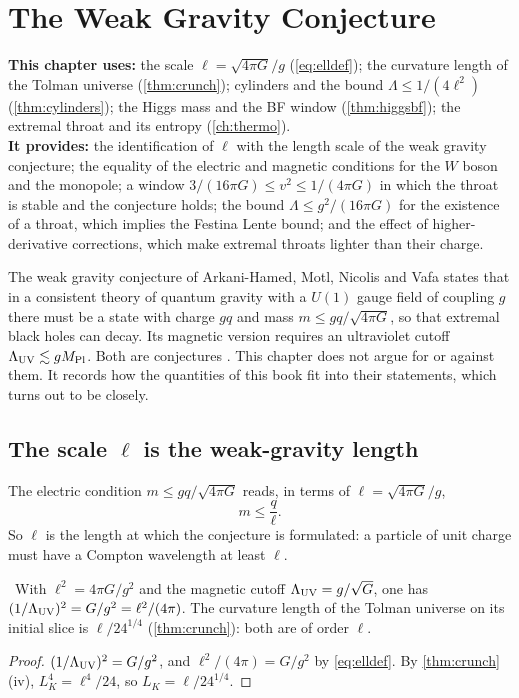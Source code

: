\chapter{The Weak Gravity Conjecture}
\label{ch:wgc}

\begin{usesbox}
\textbf{This chapter uses:} the scale $\ell=\sqrt{4\pi G}/g$ (\cref{eq:elldef}); the curvature length of the Tolman universe (\cref{thm:crunch}); cylinders and the bound $\Lambda\le1/(4\ell^2)$ (\cref{thm:cylinders}); the Higgs mass and the BF window (\cref{thm:higgsbf}); the extremal throat and its entropy (\cref{ch:thermo}).\\
\textbf{It provides:} the identification of $\ell$ with the length scale of the weak gravity conjecture; the equality of the electric and magnetic conditions for the $W$ boson and the monopole; a window $3/(16\pi G)\le v^2\le1/(4\pi G)$ in which the throat is stable and the conjecture holds; the bound $\Lambda\le g^2/(16\pi G)$ for the existence of a throat, which implies the Festina Lente bound; and the effect of higher-derivative corrections, which make extremal throats lighter than their charge.
\end{usesbox}

The weak gravity conjecture of Arkani-Hamed, Motl, Nicolis and Vafa \cite{AMNV2007} states that in a consistent theory of quantum gravity with a $U(1)$ gauge field of coupling $g$ there must be a state with charge $gq$ and mass $m\le gq/\sqrt{4\pi G}$, so that extremal black holes can decay. Its magnetic version requires an ultraviolet cutoff $\Lambda_{\rm UV}\lesssim gM_{\rm Pl}$. Both are conjectures \ext. This chapter does not argue for or against them. It records how the quantities of this book fit into their statements, which turns out to be closely.

\section{The scale \texorpdfstring{$\ell$}{l} is the weak-gravity length}

The electric condition $m\le gq/\sqrt{4\pi G}$ reads, in terms of $\ell=\sqrt{4\pi G}/g$,
\[
m\le\frac q\ell .
\]
So $\ell$ is the length at which the conjecture is formulated: a particle of unit charge must have a Compton wavelength at least $\ell$.

\begin{proposition}\label{prop:magcutoff}\ver\
With $\ell^2=4\pi G/g^2$ and the magnetic cutoff $\Lambda_{\rm UV}=g/\sqrt G$, one has $(1/\Lambda_{\rm UV})^2=G/g^2=\ell^2/(4\pi)$. The curvature length of the Tolman universe on its initial slice is $\ell/24^{1/4}$ (\cref{thm:crunch}): both are of order $\ell$.
\end{proposition}
\begin{proof}
$(1/\Lambda_{\rm UV})^2=G/g^2$, and $\ell^2/(4\pi)=G/g^2$ by \eqref{eq:elldef}. By \cref{thm:crunch}(iv), $L_K^4=\ell^4/24$, so $L_K=\ell/24^{1/4}$.
\end{proof}



